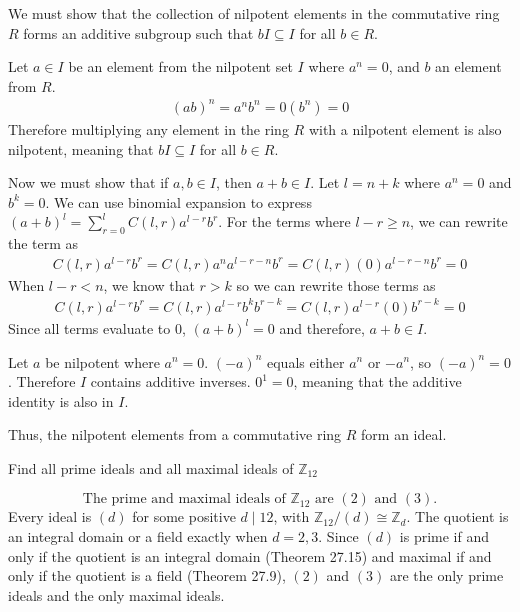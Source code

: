 \documentclass[11pt]{article}
\begin{document}
\begin{solution}
    We must show that the collection of nilpotent elements in the commutative ring $R$ forms an additive subgroup such that $bI \subseteq I$ for all $b \in R$.

    Let $a \in I$ be an element from the nilpotent set $I$ where $a^n = 0$, and $b$ an element from $R$.
    \begin{align*}
        (ab)^n = a^nb^n = 0(b^n) = 0
    \end{align*}
    Therefore multiplying any element in the ring $R$ with a nilpotent element is also nilpotent, meaning that $bI \subseteq I$ for all $b \in R$.

    Now we must show that if $a,b \in I$, then $a + b \in I$. Let $l = n + k$ where $a^n = 0$ and $b^k = 0$. We can use binomial expansion to express $(a+b)^l = \sum_{r = 0}^{l}C(l, r)a^{l-r}b^r$. For the terms where $l-r \geq n$, we can rewrite the term as 
    \begin{align*}
        C(l, r)a^{l-r}b^r = C(l,r)a^na^{l-r-n}b^r = C(l,r)(0)a^{l-r-n}b^r = 0
    \end{align*}
    When $l-r < n$, we know that $r > k$ so we can rewrite those terms as 
    \begin{align*}
        C(l, r)a^{l-r}b^r = C(l,r)a^{l-r}b^kb^{r-k} = C(l,r)a^{l-r}(0)b^{r-k} = 0
    \end{align*}
    Since all terms evaluate to 0, $(a+b)^l=0$ and therefore, $a+b \in I$.
    
    Let $a$ be nilpotent where $a^n = 0$. $(-a)^n$ equals either $a^n$ or $-a^n$, so $(-a)^n = 0$. Therefore $I$ contains additive inverses. $0^1 = 0$, meaning that the additive identity is also in $I$.

    Thus, the nilpotent elements from a commutative ring $R$ form an ideal.
\end{solution}

\begin{problem}[27.2]
    Find all prime ideals and all maximal ideals of $\mathbb{Z}_{12}$
\end{problem}
\begin{solution}
\[
\boxed{\text{The prime and maximal ideals of $\mathbb{Z}_{12}$ are $(2)$ and $(3)$.}}
\]
    Every ideal is $(d)$ for some positive $d \mid 12$, with $\mathbb{Z}_{12}/(d) \cong \mathbb{Z}_d$. The quotient is an integral domain or a field exactly when $d=2,3$. Since $(d)$ is prime if and only if the quotient is an integral domain (Theorem 27.15) and maximal if and only if the quotient is a field (Theorem 27.9), $(2)$ and $(3)$ are the only prime ideals and the only maximal ideals.
\end{solution}
\end{document}
